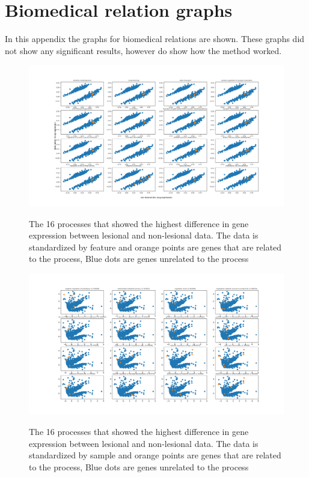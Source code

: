 \documentclass[10pt,a4paper]{article}
\begin{document}
	 
	
	
	\appendix
	
	\section{Biomedical relation graphs}
	\label{app:BiomedicalClusters}
	
	In this appendix the graphs for biomedical relations are shown. These graphs did not show any significant results, however do show how the method worked.
	
	\begin{figure}[H]
		\includegraphics[width=1\textwidth]{Sign_Processes_Psoriasis_Scaled.png}
		\label{fig:ProcessesScaledByFeature}
		\caption{The 16 processes that showed the highest difference in gene expression between lesional and non-lesional data. The data is standardized by feature and orange points are genes that are related to the process, Blue dots are genes unrelated to the process}
	\end{figure}

	\begin{figure}[H]
		\includegraphics[width=1\textwidth]{Sign_Processes_Psoriasis.png}
		\label{fig:ProcessesScaledBySample1}
		\caption{The 16 processes that showed the highest difference in gene expression between lesional and non-lesional data. The data is standardized by sample and orange points are genes that are related to the process, Blue dots are genes unrelated to the process}
	\end{figure}
	
\end{document}
